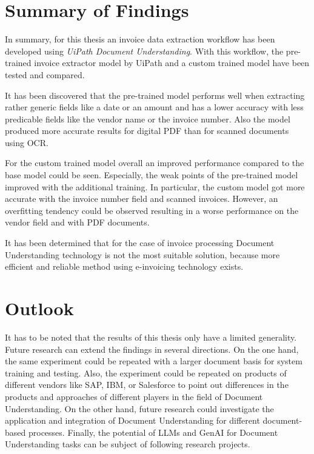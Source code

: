 \section{Summary of Findings}
In summary, for this thesis an invoice data extraction workflow has been developed using \textit{UiPath Document Understanding}. With this workflow, the pre-trained invoice extractor model by UiPath and a custom trained model have been tested and compared.

It has been discovered that the pre-trained model performs well when extracting rather generic fields like a date or an amount and has a lower accuracy with less predicable fields like the vendor name or the invoice number. Also the model produced more accurate results for digital PDF than for scanned documents using \ac{OCR}.

For the custom trained model overall an improved performance compared to the base model could be seen. Especially, the weak points of the pre-trained model improved with the additional training. In particular, the custom model got more accurate with the invoice number field and scanned invoices. However, an overfitting tendency could be observed resulting in a worse performance on the vendor field and with PDF documents.

It has been determined that for the case of invoice processing Document Understanding technology is not the most suitable solution, because more efficient and reliable method using e-invoicing technology exists.
\section{Outlook}
It has to be noted that the results of this thesis only have a limited generality. Future research can extend the findings in several directions. On the one hand, the same experiment could be repeated with a larger document basis for system training and testing. Also, the experiment could be repeated on products of different vendors like SAP, IBM, or Salesforce to point out differences in the products and approaches of different players in the field of Document Understanding. On the other hand, future research could investigate the application and integration of Document Understanding for different document-based processes. Finally, the potential of \acp{LLM} and \ac{GenAI} for Document Understanding tasks can be subject of following research projects.
